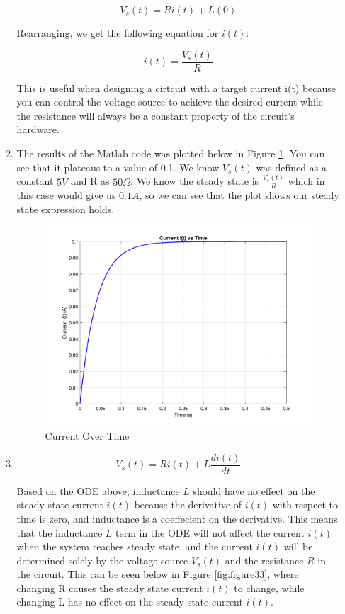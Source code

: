 \documentclass[12pt]{article}
\begin{document}
\begin{enumerate}
\begin{enumerate}
    \[
    V_s(t) = Ri(t) + L(0)
    \]

    Rearranging, we get the following equation for $i(t)$:

    \[
    i(t) = \frac{V_s(t)}{R}
    \]

    This is useful when designing a cirtcuit with a target current i(t) because you can control the voltage source to achieve the desired current while the resistance will always be a constant property of the circuit's hardware. 

  \item 
    The results of the Matlab code was plotted below in Figure \ref{fig:figure32}. You can see that it plateaus to a value of 0.1. We know $V_s(t)$ was defined as a constant $5 V$ and R as $50 \Omega$. We know the steady state is $\frac{V_s(t)}{R}$ which in this case would give us $0.1 A$, so we can see that the plot shows our steady state expression holds.

    \begin{figure}[H]
      \centering
      \includegraphics[width=\textwidth]{Figures/figure32.png}
      \caption{Current Over Time}
      \label{fig:figure32}
    \end{figure}

  \item 
    
    \[
    V_s(t) = Ri(t) + L\frac{di(t)}{dt}
    \]
  
    Based on the ODE above, inductance $L$ should have no effect on the steady state current $i(t)$ because the derivative of $i(t)$ with respect to time is zero, and inductance is a coeffecient on the derivative. This means that the inductance $L$ term in the ODE will not affect the current $i(t)$ when the system reaches steady state, and the current $i(t)$ will be determined solely by the voltage source $V_s(t)$ and the resistance $R$ in the circuit. This can be seen below in Figure \ref{fig:figure33}, where changing R causes the steady state current $i(t)$ to change, while changing L has no effect on the steady state current $i(t)$.


\end{enumerate}
\end{enumerate}
\end{document}

